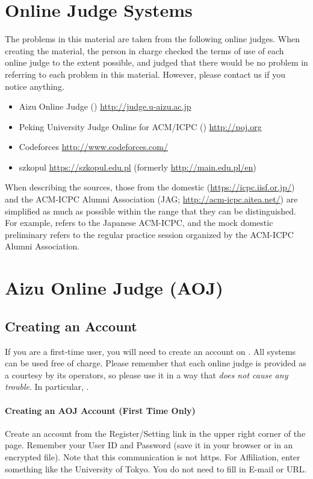 \section{Online Judge Systems}

The problems in this material are taken from the following online judges. When creating the material, the person in charge checked the terms of use of each online judge to the extent possible, and judged that there would be no problem in referring to each problem in this material. However, please contact us if you notice anything.

\begin{itemize}
    \item Aizu Online Judge () \url{http://judge.u-aizu.ac.jp}
    \item Peking University Judge Online for ACM/ICPC () \url{http://poj.org}
    \item Codeforces \url{http://www.codeforces.com/}
    \item szkopul \url{https://szkopul.edu.pl} (formerly \url{http://main.edu.pl/en})
\end{itemize}

When describing the sources, those from the domestic  (\url{https://icpc.iisf.or.jp/}) and the ACM-ICPC Alumni Association (JAG; \url{http://acm-icpc.aitea.net/}) are simplified as much as possible within the range that they can be distinguished. For example,  refers to the Japanese ACM-ICPC, and the mock domestic preliminary refers to the regular practice session organized by the ACM-ICPC Alumni Association.
\section{Aizu Online Judge (AOJ)}

\subsection*{Creating an Account}

If you are a first-time user, you will need to create an account on . All systems can be used free of charge.
Please remember that each online judge is provided as a courtesy by its operators, so please use it in a way that \emph{does not cause any trouble}. In particular, .

\paragraph{Creating an AOJ Account (First Time Only)}
Create an account from the Register/Setting link in the upper right corner of the page.
Remember your User ID and Password (save it in your browser or in an encrypted
file). Note that this communication is not https.
For Affiliation, enter something like the University of Tokyo. You do not need to fill in E-mail or URL.

